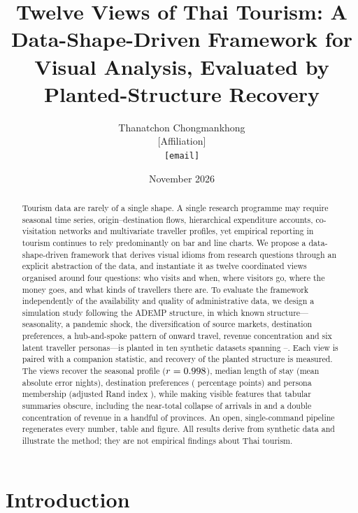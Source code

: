 \documentclass{article}
\title{Twelve Views of Thai Tourism: A Data-Shape-Driven Framework for Visual Analysis,
Evaluated by Planted-Structure Recovery}
\author{Thanatchon Chongmankhong\\
  {[Affiliation]}\\
  \texttt{[email]}}
\date{November 2026}
\begin{document}
\maketitle

\begin{abstract}
Tourism data are rarely of a single shape. A single research programme may require seasonal time
series, origin--destination flows, hierarchical expenditure accounts, co-visitation networks and
multivariate traveller profiles, yet empirical reporting in tourism continues to rely predominantly on bar and
line charts. We propose a data-shape-driven framework that derives visual idioms from research questions
through an explicit abstraction of the data, and instantiate it as twelve coordinated views organised around
four questions: who visits and when, where visitors go, where the money goes, and what kinds of travellers
there are. To evaluate the framework independently of the availability and quality of administrative data,
we design a simulation study following the ADEMP structure, in which known structure---seasonality, a
pandemic shock, the diversification of source markets, destination preferences, a hub-and-spoke pattern of
onward travel, revenue concentration and six latent traveller personas---is planted in ten synthetic
datasets spanning \FirstYear--\LatestYear. Each view is paired with a companion statistic, and recovery of
the planted structure is measured. The views recover the seasonal profile ($r = 0.998$), median
length of stay (mean absolute error \RecStayMae{} nights), destination preferences (\RecDestMae{}
percentage points) and persona membership (adjusted Rand index \SegAri), while making visible features
that tabular summaries obscure, including the near-total collapse of arrivals in \LowYear{} and a double
concentration of revenue in a handful of provinces. An open, single-command pipeline regenerates every
number, table and figure. All results derive from synthetic data and illustrate the method; they are not
empirical findings about Thai tourism.
\end{abstract}


\section{Introduction}\label{sec:intro}
\end{document}
